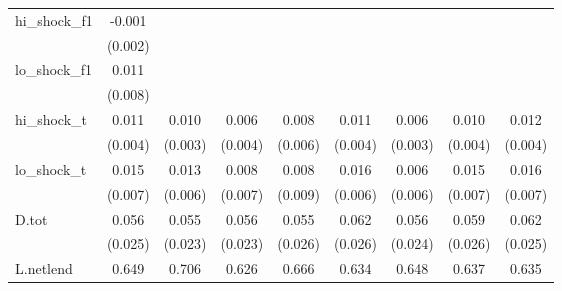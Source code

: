 {\begin{tabular}{l*{8}{c}}
\addlinespace
hi\_shock\_f1 &      -0.001         &                     &                     &                     &                     &                     &                     &                     \\
            &     (0.002)         &                     &                     &                     &                     &                     &                     &                     \\
\addlinespace
lo\_shock\_f1 &       0.011         &                     &                     &                     &                     &                     &                     &                     \\
            &     (0.008)         &                     &                     &                     &                     &                     &                     &                     \\
\addlinespace
hi\_shock\_t  &       0.011\sym{**} &       0.010\sym{***}&       0.006         &       0.008         &       0.011\sym{***}&       0.006\sym{*}  &       0.010\sym{**} &       0.012\sym{***}\\
            &     (0.004)         &     (0.003)         &     (0.004)         &     (0.006)         &     (0.004)         &     (0.003)         &     (0.004)         &     (0.004)         \\
\addlinespace
lo\_shock\_t  &       0.015\sym{*}  &       0.013\sym{**} &       0.008         &       0.008         &       0.016\sym{**} &       0.006         &       0.015\sym{**} &       0.016\sym{**} \\
            &     (0.007)         &     (0.006)         &     (0.007)         &     (0.009)         &     (0.006)         &     (0.006)         &     (0.007)         &     (0.007)         \\
\addlinespace
D.tot       &       0.056\sym{**} &       0.055\sym{**} &       0.056\sym{**} &       0.055\sym{**} &       0.062\sym{**} &       0.056\sym{**} &       0.059\sym{**} &       0.062\sym{**} \\
            &     (0.025)         &     (0.023)         &     (0.023)         &     (0.026)         &     (0.026)         &     (0.024)         &     (0.026)         &     (0.025)         \\
\addlinespace
L.netlend   &       0.649\sym{***}&       0.706\sym{***}&       0.626\sym{***}&       0.666\sym{***}&       0.634\sym{***}&       0.648\sym{***}&       0.637\sym{***}&       0.635\sym{***}\\

\end{tabular}}
